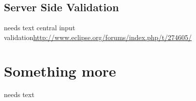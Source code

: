\documentclass[a4paper,10pt,twoside]{book}
\begin{document}
\subsection{Server Side Validation}
needs text
central input validation\url{http://www.eclipse.org/forums/index.php/t/274605/}

\section{Something more}
needs text


\ifx\wholebook\relax\else
   
   
\end{document}
